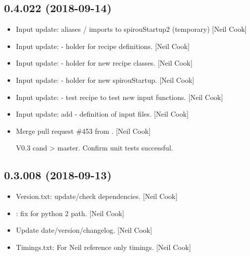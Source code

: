 \documentclass[a4paper,10pt,english]{report}
\begin{document}
\subsection{0.4.022 (2018-09-14)}
\label{\detokenize{misc/changelog:id324}}\begin{itemize}
\item {} 
Input update:  aliases / imports to
spirouStartup2 (temporary) {[}Neil Cook{]}

\item {} 
Input update:  - holder for recipe definitions. {[}Neil Cook{]}

\item {} 
Input update:  - holder for new recipe classes. {[}Neil
Cook{]}

\item {} 
Input update:  - holder for new spirouStartup. {[}Neil
Cook{]}

\item {} 
Input update:  - test recipe to test new input
functions. {[}Neil Cook{]}

\item {} 
Input update: add  - definition of input files. {[}Neil
Cook{]}

\item {} 
Merge pull request \#453 from . {[}Neil Cook{]}

V0.3 cand \textendash{}\textgreater{} master. Confirm unit tests successful.

\end{itemize}


\subsection{0.3.008 (2018-09-13)}
\label{\detokenize{misc/changelog:id325}}\begin{itemize}
\item {} 
Version.txt: update/check dependencies. {[}Neil Cook{]}

\item {} 
: fix for python 2 path. {[}Neil Cook{]}

\item {} 
Update date/version/changelog. {[}Neil Cook{]}

\item {} 
Timings.txt: For Neil reference only  timings. {[}Neil Cook{]}

\end{itemize}
\end{document}
